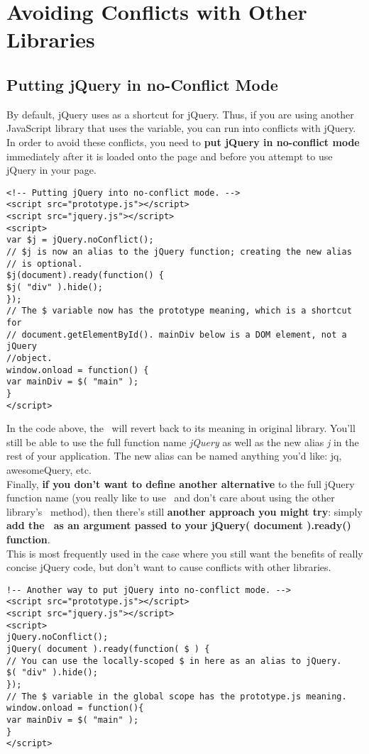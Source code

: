 \documentclass[10pt,letterpaper]{book}
\begin{document}
\section{Avoiding Conflicts with Other Libraries}
\subsection{Putting jQuery in no-Conflict Mode}
By default, jQuery uses \textdollar as a shortcut for jQuery. Thus, if you are using another JavaScript library that uses the \textdollar variable, you can run into conflicts with jQuery. In order to avoid these conflicts, you need to \textbf{put jQuery in no-conflict mode} immediately after it is loaded onto the page and before you attempt to use jQuery in your page.
\begin{lstlisting}
<!-- Putting jQuery into no-conflict mode. -->
<script src="prototype.js"></script>
<script src="jquery.js"></script>
<script>
var $j = jQuery.noConflict();
// $j is now an alias to the jQuery function; creating the new alias
// is optional.
$j(document).ready(function() {
$j( "div" ).hide();
});
// The $ variable now has the prototype meaning, which is a shortcut for
// document.getElementById(). mainDiv below is a DOM element, not a jQuery
//object.
window.onload = function() {
var mainDiv = $( "main" );
}
</script>
\end{lstlisting}
In the code above, the \textdollar \, will revert back to its meaning in original library. You'll still be able to use the full function name \textit{jQuery} as well as the new alias \textit{\textdollar j} in the rest of your application. The new alias can be named anything you'd like: jq, awesomeQuery, etc.\\
Finally, \textbf{if you don't want to define another alternative} to the full jQuery function name (you really like to use \textdollar \, and don't care about using the other library's \textdollar \, method), then there's still \textbf{another approach you might try}: simply \textbf{add the \textdollar \, as an argument passed to your jQuery( document ).ready() function}.\\
This is most frequently used in the case where you still want the benefits of really concise jQuery code, but don't want to cause conflicts with other libraries.

\begin{lstlisting}
!-- Another way to put jQuery into no-conflict mode. -->
<script src="prototype.js"></script>
<script src="jquery.js"></script>
<script>
jQuery.noConflict();
jQuery( document ).ready(function( $ ) {
// You can use the locally-scoped $ in here as an alias to jQuery.
$( "div" ).hide();
});
// The $ variable in the global scope has the prototype.js meaning.
window.onload = function(){
var mainDiv = $( "main" );
}
</script>
\end{lstlisting}
\end{document}

